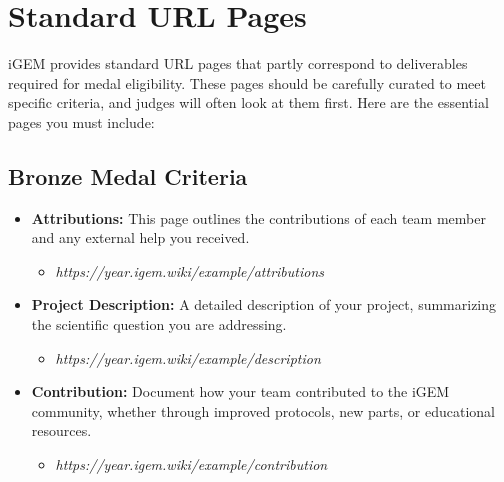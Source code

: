 

\section{Standard URL Pages} 

iGEM provides standard URL pages that partly correspond to deliverables required for medal eligibility.
These pages should be carefully curated to meet specific criteria, and judges will often look at them first.
Here are the essential pages you must include:

\subsection*{Bronze Medal Criteria} 
\begin{itemize}
    \item \textbf{Attributions:} This page outlines the contributions of each team member and any external help you received.
    \begin{itemize}
        \item \textit{https://year.igem.wiki/example/attributions}
    \end{itemize}
    \item \textbf{Project Description:} A detailed description of your project, summarizing the scientific question you are addressing.
    \begin{itemize}
        \item  \textit{https://year.igem.wiki/example/description}
    \end{itemize}
    \item \textbf{Contribution:} Document how your team contributed to the iGEM community, whether through improved protocols, new parts, or educational resources.
    \begin{itemize}
        \item  \textit{https://year.igem.wiki/example/contribution}
    \end{itemize}
\end{itemize}

